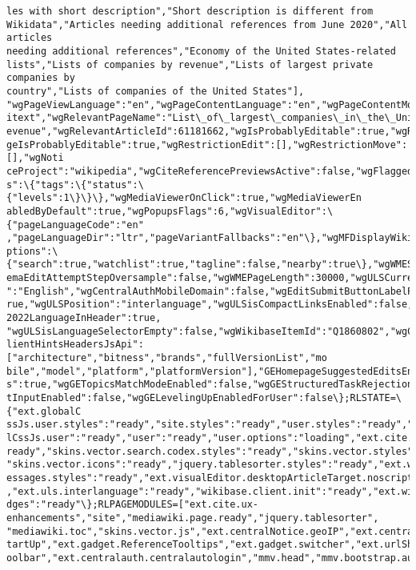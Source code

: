 \documentclass[11pt]{article}
\begin{document}
\begin{Verbatim}[commandchars=\\\{\}]
les with short description","Short description is different from
Wikidata","Articles needing additional references from June 2020","All articles
needing additional references","Economy of the United States-related
lists","Lists of companies by revenue","Lists of largest private companies by
country","Lists of companies of the United States"],
"wgPageViewLanguage":"en","wgPageContentLanguage":"en","wgPageContentModel":"wik
itext","wgRelevantPageName":"List\_of\_largest\_companies\_in\_the\_United\_States\_by\_r
evenue","wgRelevantArticleId":61181662,"wgIsProbablyEditable":true,"wgRelevantPa
geIsProbablyEditable":true,"wgRestrictionEdit":[],"wgRestrictionMove":[],"wgNoti
ceProject":"wikipedia","wgCiteReferencePreviewsActive":false,"wgFlaggedRevsParam
s":\{"tags":\{"status":\{"levels":1\}\}\},"wgMediaViewerOnClick":true,"wgMediaViewerEn
abledByDefault":true,"wgPopupsFlags":6,"wgVisualEditor":\{"pageLanguageCode":"en"
,"pageLanguageDir":"ltr","pageVariantFallbacks":"en"\},"wgMFDisplayWikibaseDescri
ptions":\{"search":true,"watchlist":true,"tagline":false,"nearby":true\},"wgWMESch
emaEditAttemptStepOversample":false,"wgWMEPageLength":30000,"wgULSCurrentAutonym
":"English","wgCentralAuthMobileDomain":false,"wgEditSubmitButtonLabelPublish":t
rue,"wgULSPosition":"interlanguage","wgULSisCompactLinksEnabled":false,"wgVector
2022LanguageInHeader":true,
"wgULSisLanguageSelectorEmpty":false,"wgWikibaseItemId":"Q1860802","wgCheckUserC
lientHintsHeadersJsApi":["architecture","bitness","brands","fullVersionList","mo
bile","model","platform","platformVersion"],"GEHomepageSuggestedEditsEnableTopic
s":true,"wgGETopicsMatchModeEnabled":false,"wgGEStructuredTaskRejectionReasonTex
tInputEnabled":false,"wgGELevelingUpEnabledForUser":false\};RLSTATE=\{"ext.globalC
ssJs.user.styles":"ready","site.styles":"ready","user.styles":"ready","ext.globa
lCssJs.user":"ready","user":"ready","user.options":"loading","ext.cite.styles":"
ready","skins.vector.search.codex.styles":"ready","skins.vector.styles":"ready",
"skins.vector.icons":"ready","jquery.tablesorter.styles":"ready","ext.wikimediam
essages.styles":"ready","ext.visualEditor.desktopArticleTarget.noscript":"ready"
,"ext.uls.interlanguage":"ready","wikibase.client.init":"ready","ext.wikimediaBa
dges":"ready"\};RLPAGEMODULES=["ext.cite.ux-
enhancements","site","mediawiki.page.ready","jquery.tablesorter",
"mediawiki.toc","skins.vector.js","ext.centralNotice.geoIP","ext.centralNotice.s
tartUp","ext.gadget.ReferenceTooltips","ext.gadget.switcher","ext.urlShortener.t
oolbar","ext.centralauth.centralautologin","mmv.head","mmv.bootstrap.autostart",

\end{Verbatim}
\end{document}

